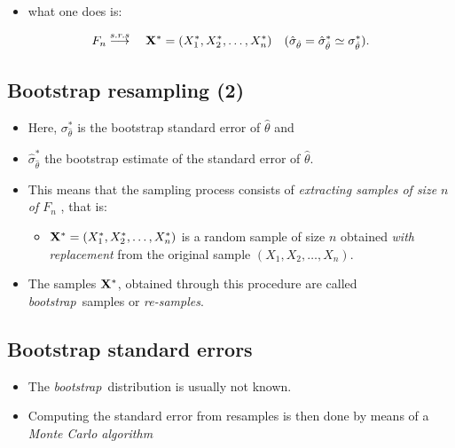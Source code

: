 \documentclass[
  letterpaper,
  DIV=11,
  numbers=noendperiod]{scrartcl}
\providecommand{\tightlist}{%
  \setlength{\itemsep}{0pt}\setlength{\parskip}{0pt}}\usepackage{longtable,booktabs,array}
\begin{document}
\begin{itemize}
\tightlist
\item
  what one does is:
\end{itemize}

\[
F_n\stackrel{s.r.s}{\longrightarrow }\quad {\bf X^{*}}=(X_1^{*},X_2^{*},
\dots ,X_n^{*}) \quad (\hat \sigma_{\hat\theta}= \hat \sigma_{\hat \theta}^* \simeq \sigma_{\hat \theta}^*).
\]

\hypertarget{bootstrap-resampling-2}{%
\subsection{Bootstrap resampling (2)}\label{bootstrap-resampling-2}}

\begin{itemize}
\item
  Here, \(\sigma_{\hat \theta}^*\) is the bootstrap standard error of
  \(\hat \theta\) and
\item
  \(\hat \sigma_{\hat \theta}^*\) the bootstrap estimate of the standard
  error of \(\hat \theta\).
\item
  This means that the sampling process consists of \emph{extracting
  samples of size \(n\) of \(F_n\)} , that is:

  \begin{itemize}
  \tightlist
  \item
    \({\bf X^{*}}=(X_1^{*},X_2^{*},\dots ,X_n^{*})\) is a random sample
    of size \(n\) obtained \emph{with replacement} from the original
    sample \((X_1,X_2,\dots ,X_n)\).
  \end{itemize}
\item
  The samples \({\bf X^*}\), obtained through this procedure are called
  \emph{bootstrap}~samples or \emph{re-samples}.
\end{itemize}

\hypertarget{bootstrap-standard-errors}{%
\subsection{Bootstrap standard errors}\label{bootstrap-standard-errors}}

\begin{itemize}
\tightlist
\item
  The \emph{bootstrap}~distribution is usually not known.
\item
  Computing the standard error from resamples is then done by means of a
  \emph{Monte Carlo algorithm}
\end{itemize}
\end{document}
